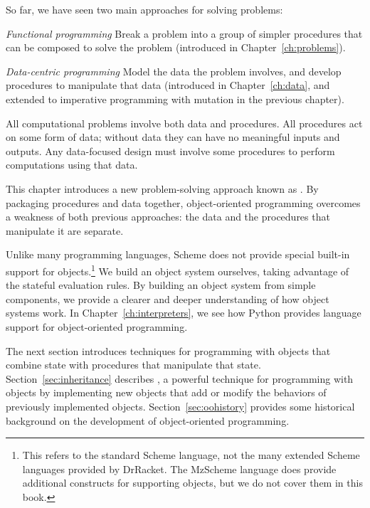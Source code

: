 \begin{schemeregion}

So far, we have seen two main approaches for solving problems:
\begin{descriptionlist}
\item [\emph{Functional programming}] \forcenl Break a problem into a group of simpler procedures that can be composed to solve the problem (introduced in Chapter~\ref{ch:problems}).
\item [\emph{Data-centric programming}] \forcenl Model the data the problem involves, and develop procedures to manipulate that data (introduced in Chapter~\ref{ch:data}, and extended to imperative programming with mutation in the previous chapter).
\end{descriptionlist}

All computational problems involve both data and procedures.  All procedures act on some form of data; without data they can have no meaningful inputs and outputs.  Any data-focused design must involve some procedures to perform computations using that data.  

This chapter introduces a new problem-solving approach known as .  By packaging procedures and data together, object-or\-i\-en\-ted programming overcomes a weakness of both previous approaches: the data and the procedures that manipulate it are separate. 

Unlike many programming languages, Scheme does not provide special built-in support for objects.\footnote{This refers to the standard Scheme language, not the many extended Scheme languages provided by DrRacket.  The MzScheme language does provide additional constructs for supporting objects, but we do not cover them in this book.}  We build an object system ourselves, taking advantage of the stateful evaluation rules.  By building an object system from simple components, we provide a clearer and deeper understanding of how object systems work.  In Chapter~\ref{ch:interpreters}, we see how Python provides language support for object-oriented programming.

The next section introduces techniques for programming with objects that combine state with procedures that manipulate that state.  Section~\ref{sec:inheritance} describes , a powerful technique for programming with objects by implementing new objects that add or modify the behaviors of previously implemented objects.  Section~\ref{sec:oohistory} provides some historical background on the development of object-oriented programming.


\end{schemeregion}
